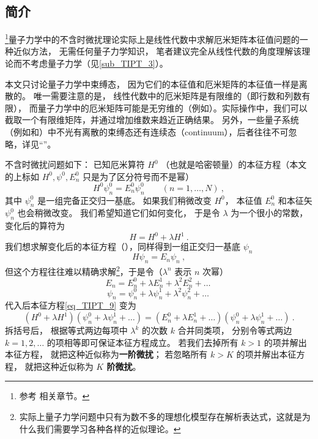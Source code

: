 

\subsection{简介}
\footnote{参考 \cite{GriffQ} \cite{Shankar} \cite{Sakurai} \cite{Merzbacher} 相关章节。}量子力学中的不含时微扰理论实际上是线性代数中求解厄米矩阵本征值问题的一种近似方法， 无需任何量子力学知识， 笔者建议完全从线性代数的角度理解该理论而不考虑量子力学（见\autoref{sub_TIPT_3}）。

本文只讨论量子力学中束缚态， 因为它们的本征值和厄米矩阵的本征值一样是离散的。 唯一需要注意的是， 线性代数中的厄米矩阵是有限维的（即行数和列数有限）， 而量子力学中的厄米矩阵可能是无穷维的（例如）。实际操作中，我们可以截取一个有限维矩阵，并通过增加维数来趋近正确结果。 另外，一些量子系统（例如和）中不光有离散的束缚态还有连续态（continuum），后者往往不可忽略，详见“”。

不含时微扰问题如下： 已知厄米算符 $H^0$ （也就是哈密顿量）的本征方程（本文的上标如 $H^0, \psi^0, E_n^0$ 只是为了区分符号而不是幂）
\begin{equation}
H^0 \psi_n^0 = E_n^0 \psi_n^0 \qquad (n = 1,\dots, N)~,
\end{equation}
其中 $\psi_n^0$ 是一组完备正交归一基底。 如果我们稍微改变 $H^0$， 本征值 $E_n^0$ 和本征矢 $\psi_n^0$ 也会稍微改变。 我们希望知道它们如何变化， 于是令 $\lambda$ 为一个很小的常数， 变化后的算符为
\begin{equation}\label{eq_TIPT_3}
H = H^0 + \lambda H^1~.
\end{equation}
我们想求解变化后的本征方程（），同样得到一组正交归一基底 $\psi_n$
\begin{equation}\label{eq_TIPT_9}
H \psi_n = E_n \psi_n~,
\end{equation}
但这个方程往往难以精确求解\footnote{实际上量子力学问题中只有为数不多的理想化模型存在解析表达式，这就是为什么我们需要学习各种各样的近似理论。}，于是令（$\lambda^n$ 表示 $n$ 次幂）
\begin{equation}\label{eq_TIPT_11}
E_n = E_n^0 + \lambda E_n^1 + \lambda^2 E_n^2 + \dots~
\end{equation}
\begin{equation}\label{eq_TIPT_12}
\psi_n = \psi_n^0 + \lambda\psi_n^1 + \lambda^2 \psi_n^2 + \dots~
\end{equation}
代入后本征方程\autoref{eq_TIPT_9} 变为
\begin{equation}\label{eq_TIPT_10}
(H^0 + \lambda H^1)(\psi_n^0 + \lambda\psi_n^1 + \dots) = (E_n^0 + \lambda E_n^1 + \dots)(\psi_n^0 + \lambda\psi_n^1 + \dots)~.
\end{equation}
拆括号后， 根据等式两边每项中 $\lambda^k$ 的次数 $k$ 合并同类项， 分别令等式两边 $k=1,2,\dots$ 的项相等即可保证本征方程成立。 若我们去掉所有 $k > 1$ 的项并解出本征方程， 就把这种近似称为\textbf{一阶微扰}； 若忽略所有 $k > K$ 的项并解出本征方程， 就把这种近似称为 \textbf{$K$ 阶微扰}。

